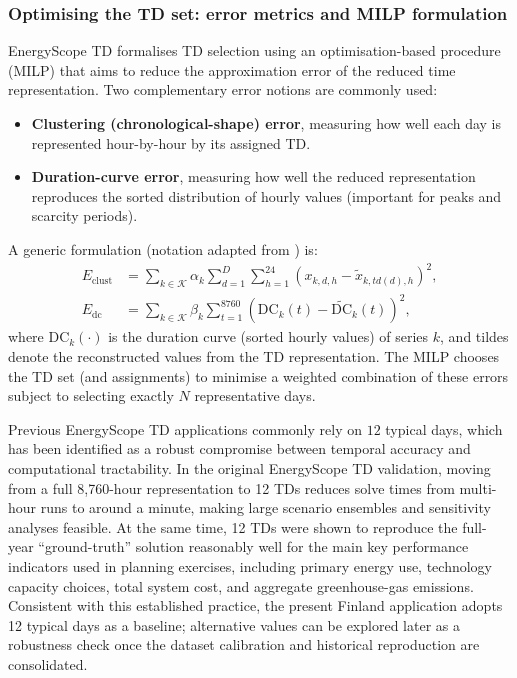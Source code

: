 \documentclass{article}
\begin{document}
\subsubsection{Optimising the TD set: error metrics and MILP formulation}
EnergyScope TD formalises TD selection using an optimisation-based procedure (MILP) that aims to reduce the approximation error of the reduced time representation. Two complementary error notions are commonly used:
\begin{itemize}
  \item \textbf{Clustering (chronological-shape) error}, measuring how well each day is represented hour-by-hour by its assigned TD.
  \item \textbf{Duration-curve error}, measuring how well the reduced representation reproduces the sorted distribution of hourly values (important for peaks and scarcity periods).
\end{itemize}
A generic formulation (notation adapted from \citet{limpens_energyscope_2019}) is:
\begin{align}
E_{\mathrm{clust}} &= \sum_{k \in \mathcal{K}} \alpha_k \sum_{d=1}^{D} \sum_{h=1}^{24} \left(x_{k,d,h} - \tilde{x}_{k,td(d),h}\right)^2, \\
E_{\mathrm{dc}} &= \sum_{k \in \mathcal{K}} \beta_k \sum_{t=1}^{8760} \left(\mathrm{DC}_k(t) - \widetilde{\mathrm{DC}}_k(t)\right)^2,
\end{align}
where $\mathrm{DC}_k(\cdot)$ is the duration curve (sorted hourly values) of series $k$, and tildes denote the reconstructed values from the TD representation. The MILP chooses the TD set (and assignments) to minimise a weighted combination of these errors subject to selecting exactly $N$ representative days.

Previous EnergyScope TD applications commonly rely on $12$ typical days, which has been identified as a robust compromise between temporal accuracy and computational tractability. In the original EnergyScope TD validation, moving from a full 8{,}760-hour representation to 12 TDs reduces solve times from multi-hour runs to around a minute, making large scenario ensembles and sensitivity analyses feasible. At the same time, 12 TDs were shown to reproduce the full-year ``ground-truth'' solution reasonably well for the main key performance indicators used in planning exercises, including primary energy use, technology capacity choices, total system cost, and aggregate greenhouse-gas emissions. Consistent with this established practice, the present Finland application adopts 12 typical days as a baseline; alternative values can be explored later as a robustness check once the dataset calibration and historical reproduction are consolidated.
\end{document}
